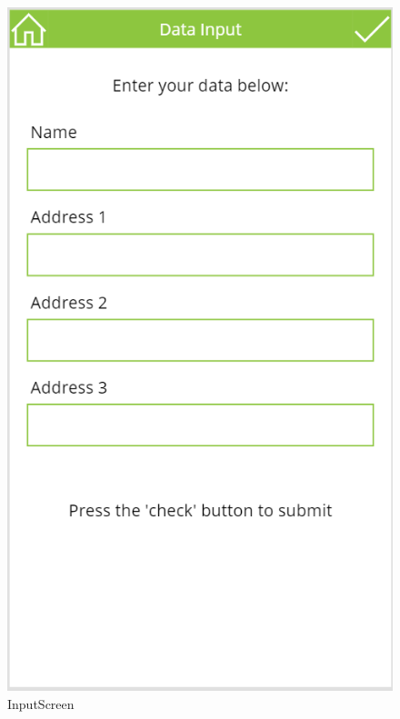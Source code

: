 \begin{figure}[th]
	\centering
	\includegraphics[width=0.7\linewidth]{img/InputScreen}
	\caption[InputScreen]{InputScreen}
	\label{fig:inputscreen}
\end{figure}


